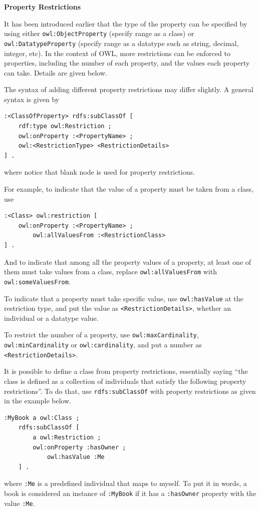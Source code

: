 \vspace{0.1in}
\noindent \textbf{Property Restrictions}
\vspace{0.1in}

It has been introduced earlier that the type of the property can be specified by using either \verb|owl:ObjectProperty| (specify range as a class) or \verb|owl:DatatypeProperty| (specify range as a datatype such as string, decimal, integer, etc). In the context of OWL, more restrictions can be enforced to properties, including the number of each property, and the values each property can take. Details are given below.

The syntax of adding different property restrictions may differ slightly. A general syntax is given by
\begin{lstlisting}
:<ClassOfProperty> rdfs:subClassOf [
    rdf:type owl:Restriction ;
    owl:onProperty :<PropertyName> ;
    owl:<RestrictionType> <RestrictionDetails>
] .
\end{lstlisting}
where notice that blank node is used for property restrictions.

For example, to indicate that the value of a property must be taken from a class, use
\begin{lstlisting}
:<Class> owl:restriction [
	owl:onProperty :<PropertyName> ;
		owl:allValuesFrom :<RestrictionClass>
] .
\end{lstlisting}
And to indicate that among all the property values of a property, at least one of them must take values from a class, replace \verb|owl:allValuesFrom| with \verb|owl:someValuesFrom|.

To indicate that a property must take specific value, use \verb|owl:hasValue| at the restriction type, and put the value as \verb|<RestrictionDetails>|, whether an individual or a datatype value.

To restrict the number of a property, use \verb|owl:maxCardinality|, \verb|owl:minCardinality| or \verb|owl:cardinality|, and put a number as \verb|<RestrictionDetails>|.

It is possible to define a class from property restrictions, essentially saying ``the class is defined as a collection of individuals that satisfy the following property restrictions''. To do that, use \verb|rdfs:subClassOf| with property restrictions as given in the example below.
\begin{lstlisting}
:MyBook a owl:Class ;
	rdfs:subClassOf [
		a owl:Restriction ;
		owl:onProperty :hasOwner ;
			owl:hasValue :Me
	] .
\end{lstlisting}
where \verb|:Me| is a predefined individual that maps to myself. To put it in words, a book is considered an instance of \verb|:MyBook| if it has a \verb|:hasOwner| property with the value \verb|:Me|.


